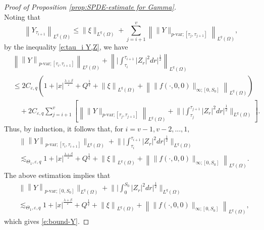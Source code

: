 \documentclass[11pt,reqno]{amsart}
\numberwithin{equation}{section}
\begin{document}
\begin{proof}[Proof of Proposition \ref{prop:SPDE-estimate for Gamma}]
\begin{equation}
\end{equation}
Noting that 
\[\left\|Y_{\tau_{i+1}}\right\|_{L^{q}(\Omega)} \le \|\xi\|_{L^{q}(\Omega)} + \sum_{j=i+1}^{v}\left\|\|Y\|_{p\text{-var};[\tau_{j},\tau_{j+1}]}\right\|_{L^{q}(\Omega)},\]
by the inequality \eqref{e:tau_i Y,Z}, we have
\begin{equation*}
\begin{aligned}
&\left\|\left\|Y\right\|_{p\text{-var};[\tau_{i},\tau_{i+1}]}\right\|_{L^{q}(\Omega)} + \left\|\Big|\int_{\tau_{i}}^{\tau_{i+1}}|Z_{r}|^{2}dr\Big|^{\frac{1}{2}}\right\|_{L^{q}(\Omega)}\\
&\le 2C_{\varepsilon,q} \left( 1 + |x|^{\frac{\lambda+\beta}{\varepsilon}} + Q^{\frac{1}{q}} + \left\|\xi\right\|_{L^{q}(\Omega)} + \left\|\|f(\cdot,0,0)\|_{\infty;[0,S_{0}]}\right\|_{L^{q}(\Omega)}\right)\\
&\quad + 2C_{\varepsilon,q} \sum_{j=i+1}^{v}\left[\left\|\|Y\|_{p\text{-var};[\tau_{j},\tau_{j+1}]}\right\|_{L^{q}(\Omega)} + \bigg\|\Big|\int_{\tau_{j}}^{\tau_{j+1}}|Z_{r}|^{2}dr\Big|^{\frac{1}{2}}\bigg\|_{L^{q}(\Omega)}\right].
\end{aligned}
\end{equation*}
Thus, by induction, it follows that, for  $i=v-1,v-2,...,1,$
\begin{equation*}
\begin{aligned}
&\Big\|\left\|Y\right\|_{p\text{-var};[\tau_i,\tau_{i+1}]}\Big\|_{L^{q}(\Omega)} + \bigg\|\Big|\int_{\tau_i}^{\tau_{i+1}}|Z_{r}|^{2}dr\Big|^{\frac{1}{2}}\bigg\|_{L^{q}(\Omega)}\\
&\lesssim_{\Theta_{1},\varepsilon,q}  1 + |x|^{\frac{\lambda+\beta}{\varepsilon}} + Q^{\frac{1}{q}} + \left\|\xi\right\|_{L^{q}(\Omega)} + \left\|\|f(\cdot,0,0)\|_{\infty;[0,S_{0}]}\right\|_{L^{q}(\Omega)}.
\end{aligned}
\end{equation*}
The above estimation implies that
\begin{equation}\label{e:Gronwall 1}
\begin{aligned}
&\Big\|\left\|Y\right\|_{p\text{-var};[0,S_{0}]}\Big\|_{L^{q}(\Omega)} + \bigg\| \Big|\int_{0}^{S_{0}}|Z_{r}|^{2}dr\Big|^{\frac{1}{2}}\bigg\|_{L^{q}(\Omega)}\\
&\lesssim_{\Theta_{1},\varepsilon,q}  1 + |x|^{\frac{\lambda+\beta}{\varepsilon}} + Q^{\frac{1}{q}} + \left\|\xi\right\|_{L^{q}(\Omega)} + \left\|\|f(\cdot,0,0)\|_{\infty;[0,S_{0}]}\right\|_{L^{q}(\Omega)},
\end{aligned}
\end{equation}
which gives \eqref{e:bound-Y}. 


\end{proof}
\end{document}
